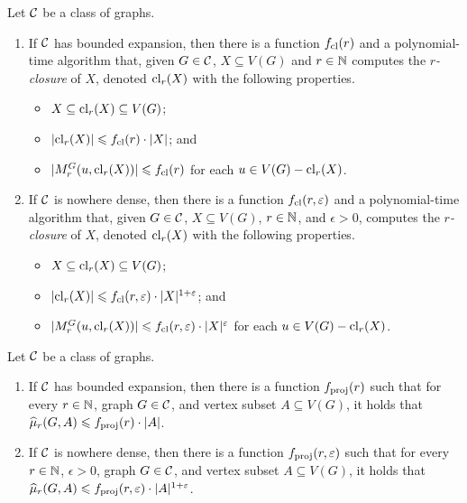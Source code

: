 \begin{lemma}[[\cite{drange2016kernelization,eickmeyer2016neighborhood}]\label{lem:closure}
Let $\mathcal{C}$ be a class of graphs. 
\begin{enumerate}
\item If $\mathcal{C}$ has bounded expansion, then there is a function $f_{\mathrm{cl}}(r)$ and a polynomial-time algorithm that, given $G\in \mathcal{C}$, $X\subseteq V(G)$ and $r\in \mathbb{N}$ computes the {\em{$r$-closure}} of $X$, denoted $\mathrm{cl}_r(X)$
with the following properties. 
\begin{itemize}
  \item $X\subseteq \mathrm{cl}_r(X)\subseteq V(G)$;
  \item $|\mathrm{cl}_r(X)|\leqslant f_{\mathrm{cl}}(r)\cdot |X|$; and
  \item $|M_r^G(u,\mathrm{cl}_r(X))|\leqslant f_{\mathrm{cl}}(r)$ for each $u\in V(G)- \mathrm{cl}_r(X)$.
\end{itemize}
\item If $\mathcal{C}$ is nowhere dense, then there is a function $f_{\mathrm{cl}}(r,\varepsilon)$ and a polynomial-time algorithm that, given $G\in \mathcal{C}$, $X\subseteq V(G)$, $r\in \mathbb{N}$, and $\epsilon>0$, computes the {\em{$r$-closure}} of $X$, denoted $\mathrm{cl}_r(X)$
with the following properties. 
\begin{itemize}
  \item $X\subseteq \mathrm{cl}_r(X)\subseteq V(G)$;
  \item $|\mathrm{cl}_r(X)|\leqslant f_{\mathrm{cl}}(r,\varepsilon)\cdot |X|^{1+\varepsilon}$; and
  \item $|M_r^G(u,\mathrm{cl}_r(X))|\leqslant f_{\mathrm{cl}}(r,\varepsilon)\cdot |X|^{\varepsilon}$ for each $u\in V(G)- \mathrm{cl}_r(X)$.
\end{itemize}
\end{enumerate}
\end{lemma}

\begin{lemma}\label{lem:projection-complexity}
Let $\mathcal{C}$ be a class of graphs. 
\begin{enumerate}
\item If $\mathcal{C}$ has bounded expansion, then there is 
  a function $f_{\mathrm{proj}}(r)$ such that for every $r\in \mathbb{N}$, graph $G\in \mathcal{C}$, and vertex subset $A\subseteq V(G)$, 
  it holds that $\widehat{\mu}_r(G,A)\leqslant f_{\mathrm{proj}}(r)\cdot |A|$.
  \item If $\mathcal{C}$ is nowhere dense, then there is 
  a function $f_{\mathrm{proj}}(r,\varepsilon)$ such that for every $r\in \mathbb{N}$, 
  $\epsilon>0$, graph $G\in \mathcal{C}$, and vertex subset $A\subseteq V(G)$, 
  it holds that $\widehat{\mu}_r(G,A)\leqslant f_{\mathrm{proj}}(r,\varepsilon)\cdot |A|^{1+\varepsilon}$.
\end{enumerate}
\end{lemma}

